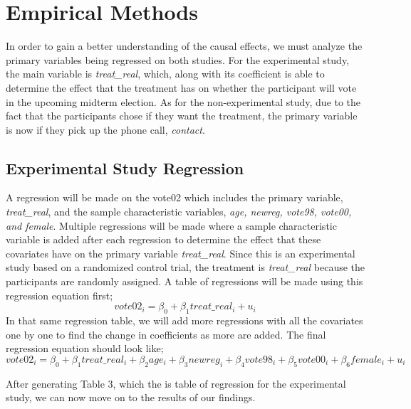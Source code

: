 \documentclass[a4paper]{article}
\begin{document}
\section{Empirical Methods}
In order to gain a better understanding of the causal effects, we must analyze the primary variables being regressed on both studies. For the experimental study, the main variable is \textit{treat\_real}, which, along with its coefficient is able to determine the effect that the treatment has on whether the participant will vote in the upcoming midterm election. As for the non-experimental study, due to the fact that the participants chose if they want the treatment, the primary variable is now if they pick up the phone call, \textit{contact}.

\subsection{Experimental Study Regression}
A regression will be made on the vote02 which includes the primary variable, \textit{treat\_real}, and the sample characteristic variables, \textit{age, newreg, vote98, vote00, and female}. Multiple regressions will be made where a sample characteristic variable is added after each regression to determine the effect that these covariates have on the primary variable \textit{treat\_real}. Since this is an experimental study based on a randomized control trial, the treatment is \textit{treat\_real} because the participants are randomly assigned. A table of regressions will be made using this regression equation first;
\[vote02_i=\beta_0 +\beta_1treat\_real_i+u_i\] 
In that same regression table, we will add more regressions with all the covariates one by one to find the change in coefficients as more are added. The final regression equation should look like; 
\[vote02_i=\beta_0 +\beta_1treat\_real_i+ \beta_2age_i+ \beta_3newreg_i+ \beta_4vote98_i+ \beta_5vote00_i+ \beta_6female_i+u_i\]

\begin{flushleft}
After generating Table 3, which the is table of regression for the experimental study, we can now move on to the results of our findings. 
\end{flushleft}
\end{document}
